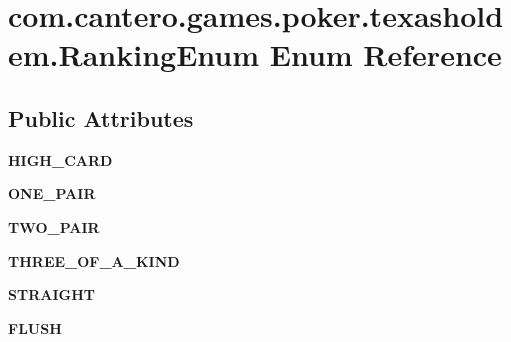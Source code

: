 \hypertarget{enumcom_1_1cantero_1_1games_1_1poker_1_1texasholdem_1_1_ranking_enum}{}\section{com.\+cantero.\+games.\+poker.\+texasholdem.\+Ranking\+Enum Enum Reference}
\label{enumcom_1_1cantero_1_1games_1_1poker_1_1texasholdem_1_1_ranking_enum}
\subsection*{Public Attributes}
\begin{DoxyCompactItemize}
\item 
\hypertarget{enumcom_1_1cantero_1_1games_1_1poker_1_1texasholdem_1_1_ranking_enum_a5d3b125acc5fd1ce489fc498627131f9}{}{\bfseries H\+I\+G\+H\+\_\+\+C\+A\+R\+D}\label{enumcom_1_1cantero_1_1games_1_1poker_1_1texasholdem_1_1_ranking_enum_a5d3b125acc5fd1ce489fc498627131f9}

\item 
\hypertarget{enumcom_1_1cantero_1_1games_1_1poker_1_1texasholdem_1_1_ranking_enum_a886aa98034421359a92f7565fe359e5c}{}{\bfseries O\+N\+E\+\_\+\+P\+A\+I\+R}\label{enumcom_1_1cantero_1_1games_1_1poker_1_1texasholdem_1_1_ranking_enum_a886aa98034421359a92f7565fe359e5c}

\item 
\hypertarget{enumcom_1_1cantero_1_1games_1_1poker_1_1texasholdem_1_1_ranking_enum_a31c22ca6d2e58b06b0935b8115d43a33}{}{\bfseries T\+W\+O\+\_\+\+P\+A\+I\+R}\label{enumcom_1_1cantero_1_1games_1_1poker_1_1texasholdem_1_1_ranking_enum_a31c22ca6d2e58b06b0935b8115d43a33}

\item 
\hypertarget{enumcom_1_1cantero_1_1games_1_1poker_1_1texasholdem_1_1_ranking_enum_a505e0673e0cec5d5b36bf0ca2b6e5b8b}{}{\bfseries T\+H\+R\+E\+E\+\_\+\+O\+F\+\_\+\+A\+\_\+\+K\+I\+N\+D}\label{enumcom_1_1cantero_1_1games_1_1poker_1_1texasholdem_1_1_ranking_enum_a505e0673e0cec5d5b36bf0ca2b6e5b8b}

\item 
\hypertarget{enumcom_1_1cantero_1_1games_1_1poker_1_1texasholdem_1_1_ranking_enum_a5c52ffdacfb87b1d468975a0c7da734d}{}{\bfseries S\+T\+R\+A\+I\+G\+H\+T}\label{enumcom_1_1cantero_1_1games_1_1poker_1_1texasholdem_1_1_ranking_enum_a5c52ffdacfb87b1d468975a0c7da734d}

\item 
\hypertarget{enumcom_1_1cantero_1_1games_1_1poker_1_1texasholdem_1_1_ranking_enum_aa579a14b3101cc654388f235a2192dee}{}{\bfseries F\+L\+U\+S\+H}\label{enumcom_1_1cantero_1_1games_1_1poker_1_1texasholdem_1_1_ranking_enum_aa579a14b3101cc654388f235a2192dee}


\end{DoxyCompactItemize}
